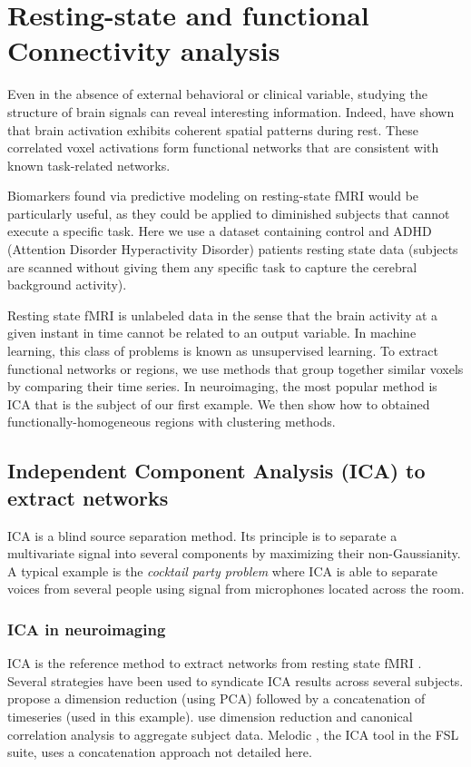 \documentclass{frontiersSCNS} %
\begin{document}
\section{Resting-state and functional Connectivity analysis}

Even in the absence of external behavioral or clinical variable, studying
the structure of brain signals can reveal interesting information.
Indeed, \cite{biswal1995} have shown that brain activation exhibits
coherent spatial patterns during rest. These correlated voxel activations
form functional networks that are consistent with known task-related networks.

Biomarkers found via predictive modeling on resting-state fMRI would be
particularly useful, as they could be applied to diminished subjects that
cannot execute a specific task. Here we use a dataset containing control
and ADHD (Attention Disorder Hyperactivity Disorder) patients resting
state data (subjects are scanned without giving them any specific task to
capture the cerebral background activity).

Resting state fMRI is unlabeled data in the sense that the brain activity
at a given instant in time cannot be related to an output variable.
In machine learning, this class of problems is known as unsupervised
learning. 
To extract functional networks or regions, we use methods that group together 
similar voxels by comparing their time
series. In neuroimaging, the most popular method is ICA that
is the subject of our first example. We then show how to obtained 
functionally-homogeneous regions with
clustering methods.

\subsection{Independent Component Analysis (ICA) to extract networks}


ICA is a blind source separation method. Its principle is to separate a
multivariate signal into several components by maximizing their non-Gaussianity.
A typical example is the \emph{cocktail party problem} where ICA is able to separate
voices from several people using signal from microphones located across the room.

\subsubsection{ICA in neuroimaging}

ICA is the reference method to extract networks from resting state
fMRI \citep{kiviniemi2003}. Several strategies have been used to syndicate ICA
results across several subjects. \cite{calhoun2001a} propose a dimension
reduction (using PCA) followed by a concatenation of timeseries (used in this
example). \cite{varoquaux2010} use dimension reduction and canonical correlation analysis
to aggregate subject data. Melodic \citep{beckmann2004}, the ICA tool in
the FSL suite, uses a concatenation approach not detailed here.
\end{document}
